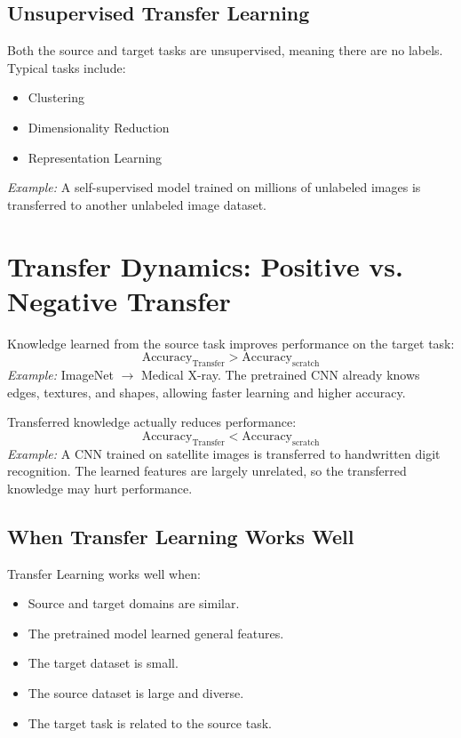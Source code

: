 \subsection{Unsupervised Transfer Learning}
Both the source and target tasks are unsupervised, meaning there are no labels. Typical tasks include:
\begin{itemize}
    \item Clustering
    \item Dimensionality Reduction
    \item Representation Learning
\end{itemize}
\textit{Example:} A self-supervised model trained on millions of unlabeled images is transferred to another unlabeled image dataset.

\section{Transfer Dynamics: Positive vs. Negative Transfer}

\begin{advbox}
Knowledge learned from the source task improves performance on the target task:
\begin{equation}
\text{Accuracy}_{\text{Transfer}} > \text{Accuracy}_{\text{scratch}}
\end{equation}
\textit{Example:} ImageNet $\to$ Medical X-ray. The pretrained CNN already knows edges, textures, and shapes, allowing faster learning and higher accuracy.
\end{advbox}

\begin{advbox}
Transferred knowledge actually reduces performance:
\begin{equation}
\text{Accuracy}_{\text{Transfer}} < \text{Accuracy}_{\text{scratch}}
\end{equation}
\textit{Example:} A CNN trained on satellite images is transferred to handwritten digit recognition. The learned features are largely unrelated, so the transferred knowledge may hurt performance.
\end{advbox}

\subsection{When Transfer Learning Works Well}
Transfer Learning works well when:
\begin{itemize}
    \item Source and target domains are similar.
    \item The pretrained model learned general features.
    \item The target dataset is small.
    \item The source dataset is large and diverse.
    \item The target task is related to the source task.
\end{itemize}

